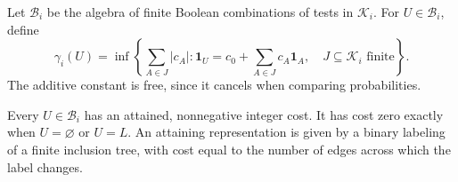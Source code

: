Let $\mathcal B_i$ be the algebra of finite Boolean combinations of tests in $\mathcal K_i$. For $U\in\mathcal B_i$, define
\begin{equation}\label{ov:cost}
 \gamma_i(U)=\inf\left\{\sum_{A\in J}|c_A|:
 \mathbf1_U=c_0+\sum_{A\in J}c_A\mathbf1_A,\quad
 J\subseteq\mathcal K_i\text{ finite}\right\}.
\end{equation}
The additive constant is free, since it cancels when comparing probabilities.

\begin{lemma}\label{ov:tree}
Every $U\in\mathcal B_i$ has an attained, nonnegative integer cost. It has cost zero exactly when $U=\varnothing$ or $U=L$. An attaining representation is given by a binary labeling of a finite inclusion tree, with cost equal to the number of edges across which the label changes.
\end{lemma}

